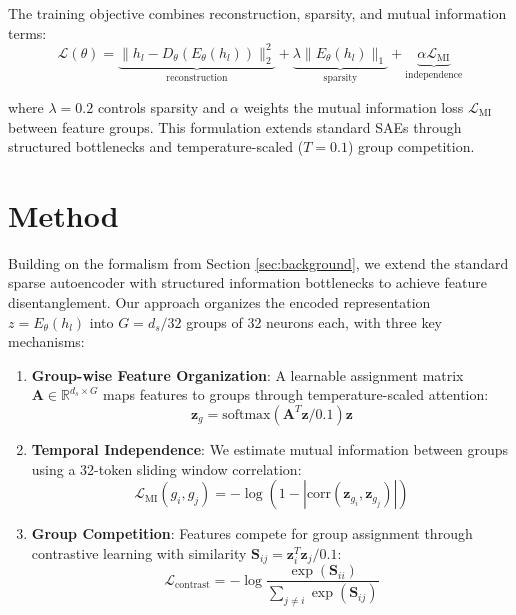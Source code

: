 \documentclass{article} %
\begin{document}
The training objective combines reconstruction, sparsity, and mutual information terms:
\begin{equation}
\mathcal{L}(\theta) = \underbrace{\|h_l - D_{\theta}(E_{\theta}(h_l))\|_2^2}_{\text{reconstruction}} + \underbrace{\lambda \|E_{\theta}(h_l)\|_1}_{\text{sparsity}} + \underbrace{\alpha \mathcal{L}_{\text{MI}}}_{\text{independence}}
\end{equation}

where $\lambda = 0.2$ controls sparsity and $\alpha$ weights the mutual information loss $\mathcal{L}_{\text{MI}}$ between feature groups. This formulation extends standard SAEs through structured bottlenecks and temperature-scaled ($T=0.1$) group competition.

\section{Method}
\label{sec:method}

Building on the formalism from Section \ref{sec:background}, we extend the standard sparse autoencoder with structured information bottlenecks to achieve feature disentanglement. Our approach organizes the encoded representation $z = E_{\theta}(h_l)$ into $G = d_s/32$ groups of 32 neurons each, with three key mechanisms:

\begin{enumerate}
    \item \textbf{Group-wise Feature Organization}: A learnable assignment matrix $\mathbf{A} \in \mathbb{R}^{d_s \times G}$ maps features to groups through temperature-scaled attention:
    \begin{equation}
        \mathbf{z}_g = \text{softmax}(\mathbf{A}^T \mathbf{z} / 0.1) \mathbf{z}
    \end{equation}
    
    \item \textbf{Temporal Independence}: We estimate mutual information between groups using a 32-token sliding window correlation:
    \begin{equation}
        \mathcal{L}_{\text{MI}}(g_i, g_j) = -\log(1 - |\text{corr}(\mathbf{z}_{g_i}, \mathbf{z}_{g_j})|)
    \end{equation}
    
    \item \textbf{Group Competition}: Features compete for group assignment through contrastive learning with similarity $\mathbf{S}_{ij} = \mathbf{z}_i^T \mathbf{z}_j / 0.1$:
    \begin{equation}
        \mathcal{L}_{\text{contrast}} = -\log \frac{\exp(\mathbf{S}_{ii})}{\sum_{j \neq i} \exp(\mathbf{S}_{ij})}
    \end{equation}
\end{enumerate}
\end{document}

